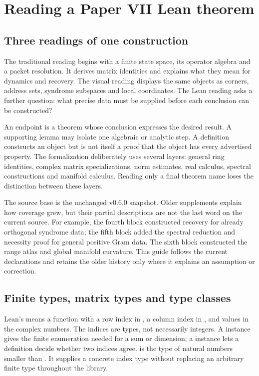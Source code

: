 \section{Reading a Paper VII Lean theorem}
\label{sec:reading}

\subsection{Three readings of one construction}
The traditional reading begins with a finite state space, its operator algebra and a packet resolution. It derives matrix identities and explains what they mean for dynamics and recovery. The visual reading displays the same objects as corners, address sets, syndrome subspaces and local coordinates. The Lean reading asks a further question: what precise data must be supplied before each conclusion can be constructed?

An endpoint is a theorem whose conclusion expresses the desired result. A supporting lemma may isolate one algebraic or analytic step. A definition constructs an object but is not itself a proof that the object has every advertised property. The formalization deliberately uses several layers: general ring identities, complex matrix specializations, norm estimates, real calculus, spectral constructions and manifold calculus. Reading only a final theorem name loses the distinction between these layers.

The source base is the unchanged v0.6.0 snapshot. Older supplements explain how coverage grew, but their partial descriptions are not the last word on the current source. For example, the fourth block constructed recovery for already orthogonal syndrome data; the fifth block added the spectral reduction and necessity proof for general positive Gram data. The sixth block constructed the range atlas and global manifold curvature. This guide follows the current declarations and retains the older history only where it explains an assumption or correction.

\subsection{Finite types, matrix types and type classes}
Lean's  means a function with a row index in , a column index in , and values in the complex numbers. The indices are types, not necessarily integers. A  instance gives the finite enumeration needed for a sum or dimension; a  instance lets a definition decide whether two indices agree.  is the type of natural numbers smaller than . It supplies a concrete index type without replacing an arbitrary finite type throughout the library.

